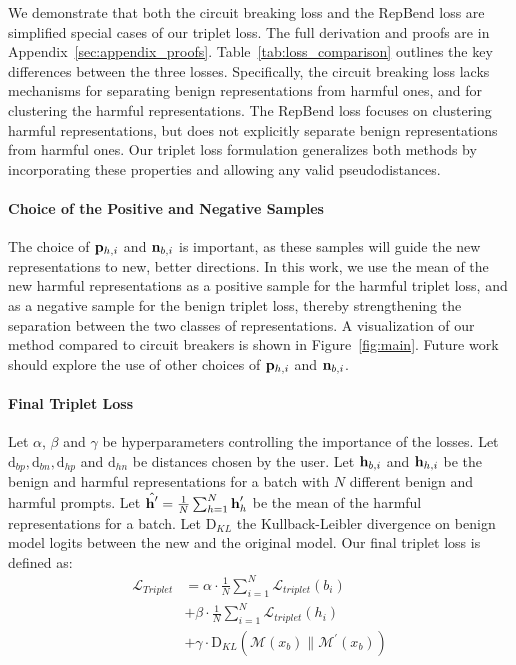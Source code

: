 \documentclass[11pt]{article}
\begin{document}
We demonstrate that both the circuit breaking loss and the RepBend loss are simplified special cases of our triplet loss.
The full derivation and proofs are in Appendix~\ref{sec:appendix_proofs}.
Table~\ref{tab:loss_comparison} outlines the key differences between the three losses.
Specifically, the circuit breaking loss lacks mechanisms for separating benign representations from harmful ones, and for clustering the harmful representations. The RepBend loss focuses on clustering harmful representations, but does not explicitly separate benign representations from harmful ones. Our triplet loss formulation generalizes both methods by incorporating these properties and allowing any valid pseudodistances.

\newcommand{\KL}{\mathrm{D}_{KL}}
\newcommand{\dd}{\text{d}}
\newcommand{\reddd}{\textcolor{red}{$\dd_0$}}

\newcommand{\cmark}{\textcolor{green!50!black}{\ding{51}}}
\newcommand{\xmark}{\textcolor{red!50!black}{\ding{55}}}

\paragraph{Choice of the Positive and Negative Samples}
The choice of $\mathbf{p}_{h,i}$ and $\mathbf{n}_{b,i}$ is important, as these samples will guide the new representations to new, better directions.
In this work, we use the mean of the new harmful representations as a positive sample for the harmful triplet loss, and as a negative sample for the benign triplet loss,
thereby strengthening the separation between the two classes of representations.
A visualization of our method compared to circuit breakers is shown in Figure~\ref{fig:main}. 
Future work should explore the use of other choices of $\mathbf{p}_{h,i}$ and $\mathbf{n}_{b,i}$.

\paragraph{Final Triplet Loss} Let $\alpha$, $\beta$ and $\gamma$ be hyperparameters controlling the importance of the losses.
Let $\dd_{bp}, \dd_{bn}, \dd_{hp}$ and $\dd_{hn}$ be distances chosen by the user.
Let $\textbf{h}_{b,i}$ and $\textbf{h}_{h,i}$ be the benign and harmful representations for a batch with $N$ different benign and harmful prompts.
Let $\hat{\textbf{h}^\prime} = \frac{1}{N} \sum_{h=1}^{N} \textbf{h}^\prime_{h}$ be the mean of the harmful representations for a batch. Let $\KL$ the Kullback-Leibler divergence on benign model logits between the new and the original model.
Our final triplet loss is defined as:
\begin{align}
  \mathcal{L}_{Triplet} &= \alpha \cdot \frac{1}{N} \sum_{i=1}^{N} \mathcal{L}_{triplet}(b_i) \\
                        &+ \beta \cdot \frac{1}{N} \sum_{i=1}^{N} \mathcal{L}_{triplet}(h_i) \\
    &+ \gamma \cdot \KL(\mathcal{M}(x_{b}) \parallel \mathcal{M^\prime}(x_{b})) \label{triplet:KL}
\end{align}
\end{document}

